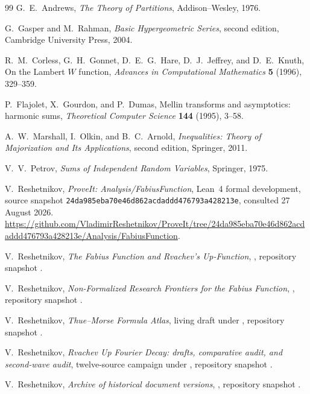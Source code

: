 \documentclass[11pt,oneside]{article}
\theoremstyle{definition}
\theoremstyle{remark}
\begin{document}
\begin{thebibliography}{99}
G.~E.~Andrews,
\newblock \emph{The Theory of Partitions},
\newblock Addison--Wesley, 1976.

G.~Gasper and M.~Rahman,
\newblock \emph{Basic Hypergeometric Series}, second edition,
\newblock Cambridge University Press, 2004.

R.~M.~Corless, G.~H.~Gonnet, D.~E.~G.~Hare, D.~J.~Jeffrey, and D.~E.~Knuth,
\newblock On the Lambert $W$ function,
\newblock \emph{Advances in Computational Mathematics} \textbf{5} (1996), 329--359.

P.~Flajolet, X.~Gourdon, and P.~Dumas,
\newblock Mellin transforms and asymptotics: harmonic sums,
\newblock \emph{Theoretical Computer Science} \textbf{144} (1995), 3--58.

A.~W.~Marshall, I.~Olkin, and B.~C.~Arnold,
\newblock \emph{Inequalities: Theory of Majorization and Its Applications}, second edition,
\newblock Springer, 2011.

V.~V.~Petrov,
\newblock \emph{Sums of Independent Random Variables},
\newblock Springer, 1975.

V.~Reshetnikov,
\newblock \emph{ProveIt: Analysis/FabiusFunction},
\newblock Lean~4 formal development, source snapshot
\texttt{24da985eba70e46d862acdaddd476793a428213e}, consulted 27 August 2026.
\newblock \url{https://github.com/VladimirReshetnikov/ProveIt/tree/24da985eba70e46d862acdaddd476793a428213e/Analysis/FabiusFunction}.

V.~Reshetnikov,
\newblock \emph{The Fabius Function and Rvachev's Up-Function},
\newblock {},
repository snapshot \cite{proveit}.

V.~Reshetnikov,
\newblock \emph{Non-Formalized Research Frontiers for the Fabius Function},
\newblock {},
repository snapshot \cite{proveit}.

V.~Reshetnikov,
\newblock \emph{Thue--Morse Formula Atlas},
\newblock living draft under
,
repository snapshot \cite{proveit}.

V.~Reshetnikov,
\newblock \emph{Rvachev Up Fourier Decay: drafts, comparative audit, and second-wave audit},
\newblock twelve-source campaign under
,
repository snapshot \cite{proveit}.

V.~Reshetnikov,
\newblock \emph{Archive of historical document versions},
\newblock {}, repository snapshot
\cite{proveit}.

\end{thebibliography}
\end{document}
